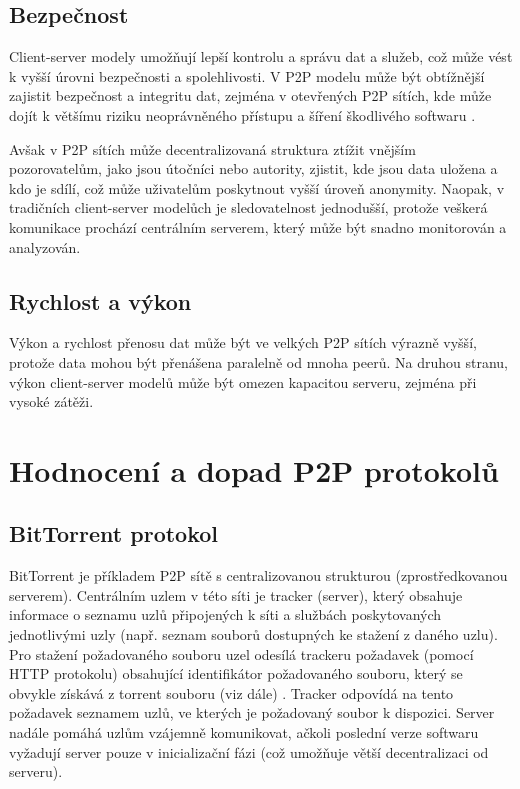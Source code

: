 \documentclass[10pt,twoside,czech,a4paper]{article}
\begin{document}
\subsection{Bezpečnost}

Client-server modely umožňují lepší kontrolu a správu dat a služeb, což může vést k vyšší úrovni bezpečnosti a spolehlivosti.
V P2P modelu může být obtížnější zajistit bezpečnost a integritu dat, zejména v otevřených P2P sítích, kde může dojít k většímu riziku neoprávněného přístupu a šíření škodlivého softwaru \cite{Leibnitz2007}.

Avšak v P2P sítích může decentralizovaná struktura ztížit vnějším pozorovatelům, jako jsou útočníci nebo autority, zjistit, kde jsou data uložena a kdo je sdílí, což může uživatelům poskytnout vyšší úroveň anonymity.
Naopak, v tradičních client-server modelůch je sledovatelnost jednodušší, protože veškerá komunikace prochází centrálním serverem, který může být snadno monitorován a analyzován.

\subsection{Rychlost a výkon}

Výkon a rychlost přenosu dat může být ve velkých P2P sítích výrazně vyšší, protože data mohou být přenášena paralelně od mnoha peerů.
Na druhou stranu, výkon client-server modelů může být omezen kapacitou serveru, zejména při vysoké zátěži.


\section{Hodnocení a dopad P2P protokolů}

\subsection{BitTorrent protokol}

BitTorrent je příkladem P2P sítě s centralizovanou strukturou (zprostředkovanou serverem).
Centrálním uzlem v této síti je tracker (server), který obsahuje informace o seznamu uzlů připojených k síti a službách poskytovaných jednotlivými uzly (např. seznam souborů dostupných ke stažení z daného uzlu).
Pro stažení požadovaného souboru uzel odesílá trackeru požadavek (pomocí HTTP protokolu) obsahující identifikátor požadovaného souboru, který se obvykle získává z torrent souboru (viz dále) \cite{Chokkalingam2004}.
Tracker odpovídá na tento požadavek seznamem uzlů, ve kterých je požadovaný soubor k dispozici\cite{Radchenko2012}.
Server nadále pomáhá uzlům vzájemně komunikovat, ačkoli poslední verze softwaru vyžadují server pouze v inicializační fázi (což umožňuje větší decentralizaci od serveru)\cite{Lande2008}.
\end{document}

